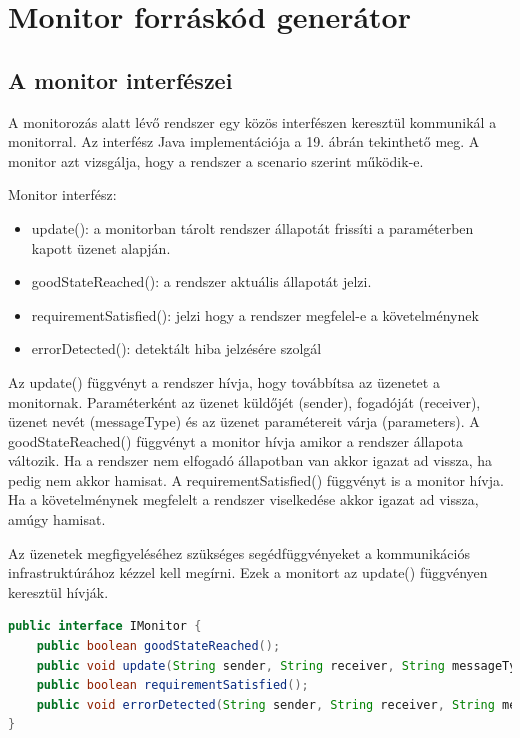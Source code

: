 \chapter{Monitor forráskód generátor}

\section{A monitor interfészei}

A monitorozás alatt lévő rendszer egy közös interfészen keresztül kommunikál a monitorral. Az interfész Java implementációja a 19. ábrán tekinthető meg. A monitor azt vizsgálja, hogy a rendszer a scenario szerint működik-e.

Monitor interfész:
\begin{itemize}
    \item update(): a monitorban tárolt rendszer állapotát frissíti a paraméterben kapott üzenet alapján.
    \item goodStateReached(): a rendszer aktuális állapotát jelzi.
    \item requirementSatisfied(): jelzi hogy a rendszer megfelel-e a követelménynek
    \item errorDetected(): detektált hiba jelzésére szolgál
\end{itemize}

Az update() függvényt a rendszer hívja, hogy továbbítsa az üzenetet a monitornak. Paraméterként az üzenet küldőjét (sender), fogadóját (receiver), üzenet nevét (messageType) és az üzenet paramétereit várja (parameters). A goodStateReached() függvényt a monitor hívja amikor a rendszer állapota változik. Ha a rendszer nem elfogadó állapotban van akkor igazat ad vissza, ha pedig nem akkor hamisat. A requirementSatisfied() függvényt is a monitor hívja. Ha a követelménynek megfelelt a rendszer viselkedése akkor igazat ad vissza, amúgy hamisat.

Az üzenetek megfigyeléséhez szükséges segédfüggvényeket a kommunikációs infrastruktúrához kézzel kell megírni. Ezek a monitort az update() függvényen keresztül hívják.

\begin{lstlisting}[language=java,frame=single, float=h!, caption={Monitor interfész Java implementációja.},captionpos=b]
public interface IMonitor {
	public boolean goodStateReached();
	public void update(String sender, String receiver, String messageType, String[] parameters);
	public boolean requirementSatisfied();
	public void errorDetected(String sender, String receiver, String messageType, String[] parameters);
}
\end{lstlisting}

